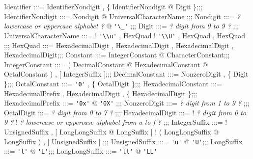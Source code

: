{\begin{bnf}[colspec={Q[0mm]Q[r,font=\sffamily]Q[r]Q[l,mode=text,font=\ttfamily,92mm]Q[l]}]
    Identifier :::=
    {\sffamily IdentifierNondigit} , \{ {\sffamily IdentifierNondigit} @ {\sffamily Digit} \};;;
    IdentifierNondigit :::= {\sffamily Nondigit} @ {\sffamily UniversalCharacterName}
    ;;;
    Nondigit :::=
    {\it ? lowercase or uppercase alphabet ?} @ \lstinline{'\_'}
    ;;;
    Digit :::=
    {\it ? digit from 0 to 9 ?}
    ;;;
    UniversalCharacterName :::=
    ! \lstinline{'\\u'} , {\sffamily HexQuad}
    ! \lstinline{'\\U'} , {\sffamily HexQuad} , {\sffamily HexQuad}
    ;;;
    HexQuad :::=
    {\sffamily HexadecimalDigit} , {\sffamily HexadecimalDigit} , {\sffamily HexadecimalDigit} , {\sffamily HexadecimalDigit};;;
    Constant :::=
    {\sffamily IntegerConstant} @ {\sffamily CharacterConstant};;;
    IntegerConstant :::=
    ( {\sffamily DecimalConstant} @ {\sffamily HexadecimalConstant} @ {\sffamily OctalConstant} ) , [ {\sffamily IntegerSuffix} ];;;
    DecimalConstant :::=
    {\sffamily NonzeroDigit} , \{ {\sffamily Digit} \};;;
    OctalConstant :::=
    \lstinline{'0'} , \{ {\sffamily OctalDigit} \};;;
    HexadecimalConstant :::=
    {\sffamily HexadecimalPrefix} , {\sffamily HexadecimalDigit} , \newline
    \{ {\sffamily HexadecimalDigit} \};;;
    HexadecimalPrefix :::=
    \lstinline{'0x'} @ \lstinline{'0X'}
    ;;;
    NonzeroDigit :::=
    {\it ? digit from 1 to 9 ?}
    ;;;
    OctalDigit :::=
    {\it ? digit from 0 to 7 ?}
    ;;;
    HexadecimalDigit :::=
    ! {\it ? digit from 0 to 9 ?}
    ! {\it ? lowercase or uppercase alphabet from a to f ?}
    ;;;
    IntegerSuffix :::=
    ! {\sffamily UnsignedSuffix} , [ {\sffamily LongLongSuffix} @ {\sffamily LongSuffix} ]
    ! ( {\sffamily LongLongSuffix} @ {\sffamily LongSuffix} ) , [ {\sffamily UnsignedSuffix} ]
    ;;;
    UnsignedSuffix :::=
    \lstinline{'u'} @ \lstinline{'U'};;;
    LongSuffix :::=
    \lstinline{'l'} @ \lstinline{'L'};;;
    LongLongSuffix :::=
    \lstinline{'ll'} @ \lstinline{'LL'}
    \end{bnf}
}

